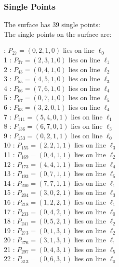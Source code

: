 \documentclass{article}
\begin{document}
{\subsubsection*{Single Points}
The surface has 39 single points:\\
The single points on the surface are:\\
\begin{multicols}{2}
 : $P_{27}=( 0, 2, 1, 0 )$ lies on line $\ell_{0}$\\
1 : $P_{37}=( 2, 3, 1, 0 )$ lies on line $\ell_{1}$\\
2 : $P_{43}=( 0, 4, 1, 0 )$ lies on line $\ell_{2}$\\
3 : $P_{55}=( 4, 5, 1, 0 )$ lies on line $\ell_{3}$\\
4 : $P_{66}=( 7, 6, 1, 0 )$ lies on line $\ell_{4}$\\
5 : $P_{67}=( 0, 7, 1, 0 )$ lies on line $\ell_{5}$\\
6 : $P_{93}=( 3, 2, 0, 1 )$ lies on line $\ell_{4}$\\
7 : $P_{111}=( 5, 4, 0, 1 )$ lies on line $\ell_{1}$\\
8 : $P_{136}=( 6, 7, 0, 1 )$ lies on line $\ell_{3}$\\
9 : $P_{153}=( 0, 2, 1, 1 )$ lies on line $\ell_{0}$\\
10 : $P_{155}=( 2, 2, 1, 1 )$ lies on line $\ell_{3}$\\
11 : $P_{169}=( 0, 4, 1, 1 )$ lies on line $\ell_{2}$\\
12 : $P_{173}=( 4, 4, 1, 1 )$ lies on line $\ell_{4}$\\
13 : $P_{193}=( 0, 7, 1, 1 )$ lies on line $\ell_{5}$\\
14 : $P_{200}=( 7, 7, 1, 1 )$ lies on line $\ell_{1}$\\
15 : $P_{204}=( 3, 0, 2, 1 )$ lies on line $\ell_{3}$\\
16 : $P_{218}=( 1, 2, 2, 1 )$ lies on line $\ell_{1}$\\
17 : $P_{233}=( 0, 4, 2, 1 )$ lies on line $\ell_{0}$\\
18 : $P_{241}=( 0, 5, 2, 1 )$ lies on line $\ell_{2}$\\
19 : $P_{273}=( 0, 1, 3, 1 )$ lies on line $\ell_{2}$\\
20 : $P_{276}=( 3, 1, 3, 1 )$ lies on line $\ell_{1}$\\
21 : $P_{297}=( 0, 4, 3, 1 )$ lies on line $\ell_{5}$\\
22 : $P_{313}=( 0, 6, 3, 1 )$ lies on line $\ell_{0}$\\

\end{multicols}}
\end{document}
